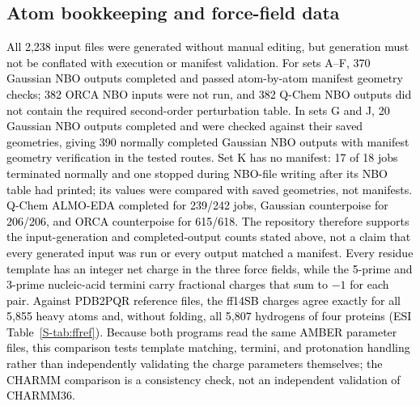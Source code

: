 \documentclass[journal=jcisd8,manuscript=article,layout=two-column]{achemso}
\newcommand{\tcb}[1]{{\textcolor{black}{#1}}}
\begin{document}
\subsection{Atom bookkeeping and force-field data}
\tcb{All 2,238 input files were generated without manual editing, but generation must not be conflated with execution or manifest validation. For sets A--F, 370 Gaussian NBO outputs completed and passed atom-by-atom manifest geometry checks; 382 ORCA NBO inputs were not run, and 382 Q-Chem NBO outputs did not contain the required second-order perturbation table. In sets G and J, 20 Gaussian NBO outputs completed and were checked against their saved geometries, giving 390 normally completed Gaussian NBO outputs with manifest geometry verification in the tested routes. Set K has no manifest: 17 of 18 jobs terminated normally and one stopped during NBO-file writing after its NBO table had printed; its values were compared with saved geometries, not manifests. Q-Chem ALMO-EDA completed for 239/242 jobs, Gaussian counterpoise for 206/206, and ORCA counterpoise for 615/618. The repository therefore supports the input-generation and completed-output counts stated above, not a claim that every generated input was run or every output matched a manifest. Every residue template has an integer net charge in the three force fields, while the 5-prime and 3-prime nucleic-acid termini carry fractional charges that sum to $-1$ for each pair. Against PDB2PQR reference files, the ff14SB charges agree exactly for all 5,855 heavy atoms and, without folding, all 5,807 hydrogens of four proteins (ESI Table~\ref{S-tab:ffref}). Because both programs read the same AMBER parameter files, this comparison tests template matching, termini, and protonation handling rather than independently validating the charge parameters themselves; the CHARMM comparison is a consistency check, not an independent validation of CHARMM36.}
\end{document}
